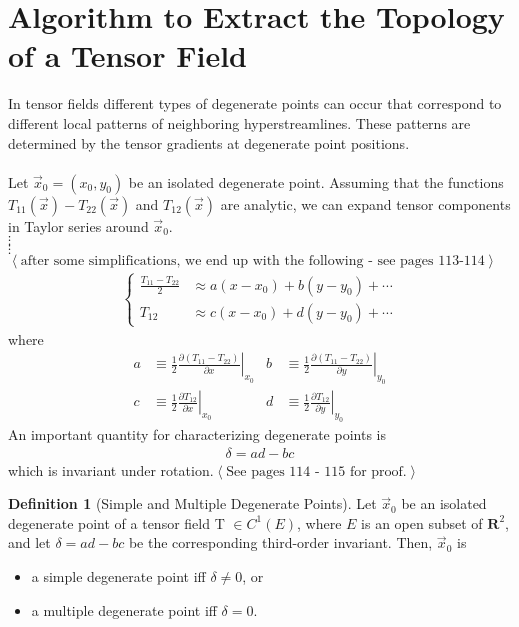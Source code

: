 \documentclass[12pt,twoside,onecolumn]{article}
\theoremstyle{definition}
\newtheorem{defn}{Definition}
\begin{document}
\section{Algorithm to Extract the Topology of a Tensor Field}
In tensor fields different types of degenerate points can occur that correspond to different
local patterns of neighboring hyperstreamlines. These patterns are determined by the tensor
gradients at degenerate point positions.
\\
\\
Let $\vec{x}_0 = (x_0,y_0)$ be an isolated degenerate point. Assuming that the functions 
$T_{11}(\vec{x}) - T_{22}(\vec{x})$ and $T_{12}(\vec{x})$ are analytic, we can expand tensor
components in Taylor series around $\vec{x}_0$.
\\
$\vdots$
\\
$\vdots$
\\
$\left<\mbox{after some simplifications, we end up with the following - see pages
 113-114}\right>$
\begin{align}
\left\{\begin{matrix}
 \frac{T_{11} - T_{22}}{2} &\approx a(x - x_0) + b(y - y_0) + \cdots \\
 T_{12} &\approx c(x - x_0) + d(y - y_0) + \cdots
\end{matrix}\right.
\end{align}
where 
\begin{align*}
a &\equiv \frac{1}{2} \left.\frac{\partial (T_{11} - T_{22})}{\partial x}\right|_{x_0} &
b &\equiv \frac{1}{2} \left.\frac{\partial (T_{11} - T_{22})}{\partial y}\right|_{y_0} \\
c &\equiv \frac{1}{2} \left.\frac{\partial T_{12}}{\partial x}\right|_{x_0} &
d &\equiv \frac{1}{2} \left.\frac{\partial T_{12}}{\partial y}\right|_{y_0}
\end{align*}
An important quantity for characterizing degenerate points is
\begin{align}
\delta = ad - bc
\end{align}
which is invariant under rotation.$\left<\mbox{See pages 114 - 115 for proof.}\right>$
\begin{defn}[Simple and Multiple Degenerate Points] \label{definition}
Let $\vec{x}_0$ be an isolated degenerate point of a tensor field T $\in C^1(E)$, where $E$ is
an open subset of $\mathbf{R}^2$, and let $\delta = ad - bc$ be the corresponding third-order
invariant. Then, $\vec{x}_0$ is
\begin{itemize}
\item a simple degenerate point iff $\delta \neq 0$, or
\item a multiple degenerate point iff $\delta = 0$.
\end{itemize}
\end{defn}
\end{document}
